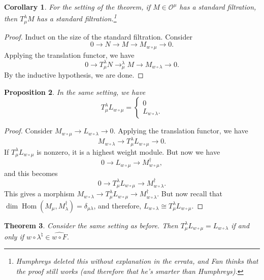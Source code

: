 \documentclass[leqno, openany]{memoir}
\newtheorem{thm}{Theorem}[section]
\newtheorem{cor}[thm]{Corollary}
\newtheorem{prop}[thm]{Proposition}
\theoremstyle{definition}
\theoremstyle{remark}
\theoremstyle{plain}
\theoremstyle{definition}
\theoremstyle{remark}
\newcommand{\cO}{\mathcal{O}}
\newcommand{\wh}[1]{\widehat{#1}}
\DeclareMathOperator{\Hom}{Hom}
\begin{document}
\begin{cor}
    For the setting of the theorem, if $M \in \cO^{\mu}$ has a standard filtration, then $T_{\mu}^{\lambda} M$ has a standard filtration.\footnote{Humphreys deleted this without explanation in the errata, and Fan thinks that the proof still works (and therefore that he's smarter than Humphreys).}
\end{cor}

\begin{proof}
    Induct on the size of the standard filtration. Consider
    \[ 0 \to N \to M \to M_{w \circ \mu} \to 0. \]
    Applying the translation functor, we have
    \[ 0 \to T_{\mu}^{\lambda} N \to _{\mu}^{\lambda} M \to M_{w \circ \lambda} \to 0. \]
    By the inductive hypothesis, we are done.
\end{proof}

\begin{prop}
    In the same setting, we have
    \[ T_{\mu}^{\lambda} L_{w \circ \mu} = \begin{cases}
        0 \\
        L_{w \circ \lambda}.
    \end{cases}
    \]
\end{prop}

\begin{proof}
    Consider $M_{w \circ \mu} \to L_{w \circ \lambda} \to 0$. Applying the translation functor, we have
    \[ M_{w \circ \lambda} \to T_{\mu}^{\lambda} L_{w \circ \mu} \to 0. \]
    If $T_{\mu}^{\lambda} L_{w \circ \mu}$ is nonzero, it is a highest weight module. But now we have
    \[ 0 \to L_{w \circ \mu} \to M_{w \circ \mu}^{\dag}, \]
    and this becomes
    \[ 0 \to T_{\mu}^{\lambda} L_{w \circ \mu} \to M_{w \circ \lambda}^{\dag}. \]
    This gives a morphism $M_{w \circ \lambda} \to T_{\mu}^{\lambda} L_{w \circ \mu} \to M_{w \circ \lambda}^{\dag}$. But now recall that $\dim \Hom(M_{\mu}, M_{\lambda}^{\dag}) = \delta_{\mu \lambda}$, and therefore, $L_{w \circ \lambda} \cong T_{\mu}^{\lambda} L_{w \circ \mu}$.
\end{proof}

\begin{thm}
    Consider the same setting as before. Then $T_{\mu}^{\lambda} L_{w \circ \mu} = L_{w \circ \lambda}$ if and only if $w \circ \lambda^{\natural} \in \wh{w \circ F}$.
\end{thm}
\end{document}
